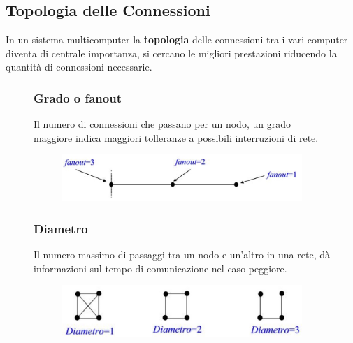 \subsection{Topologia delle Connessioni}

In un sistema multicomputer la \textbf{topologia} delle connessioni tra i vari computer diventa di centrale importanza, si cercano le migliori prestazioni riducendo la quantità di connessioni necessarie.

\begin{figure}[H]
    \centering
    \begin{minipage}{0.45\textwidth}
        \subsubsection{Grado o fanout}
        Il numero di connessioni che passano per un nodo, un grado maggiore indica maggiori tolleranze a possibili interruzioni di rete.
    \end{minipage}
    \hfill
    \begin{minipage}{0.45\textwidth}
        \begin{figure}[H]
            \centering
            \includegraphics[width=1\linewidth]{assets/fanout.jpg}
        \end{figure}
    \end{minipage}
\end{figure}

\begin{figure}[H]
    \centering
    \begin{minipage}{0.45\textwidth}
        \subsubsection{Diametro}
        Il numero massimo di passaggi tra un nodo e un'altro in una rete, dà informazioni sul tempo di comunicazione nel caso peggiore.
    \end{minipage}
    \hfill
    \begin{minipage}{0.45\textwidth}
        \begin{figure}[H]
            \centering
            \includegraphics[width=1\linewidth]{assets/diametro.jpg}
        \end{figure}
    \end{minipage}
\end{figure}

